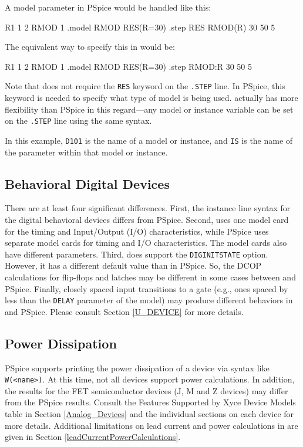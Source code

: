 A model parameter in PSpice would be handled like this:
\begin{vquote}
R1 1 2 RMOD 1
.model RMOD RES(R=30)
.step RES RMOD(R) 30 50 5
\end{vquote}
The equivalent way to specify this in \Xyce{} would be:
\begin{vquote}
R1 1 2 RMOD 1
.model RMOD RES(R=30)
.step RMOD:R 30 50 5
\end{vquote}
Note that \Xyce{} does not require the \texttt{RES} keyword on the
\texttt{.STEP} line.  In PSpice, this keyword is needed to specify 
what type of model is being used.  \Xyce{} actually has more flexibility
than PSpice in this regard---any model or instance variable can be set on
the \texttt{.STEP} line using the same syntax.


In this example, \texttt{D101} is the name of a model or instance, 
and \texttt{IS} is the name of the parameter within that model or instance.

\subsection{Behavioral Digital Devices}
There are at least four significant differences.  First, the instance line
syntax for the \Xyce{} digital behavioral devices differs from PSpice.
Second,  \Xyce{} uses one model card for the timing and Input/Output (I/O)
characteristics, while PSpice uses separate model cards for timing and I/O
characteristics.  The model cards also have different parameters. 
Third, \Xyce{} does support the \texttt{DIGINITSTATE} option. However, it has a
different default value than in PSpice.  So, the DCOP calculations for flip-flops and latches may
be different in some cases between \Xyce{} and PSpice.  Finally, closely spaced input
transitions to a gate (e.g., ones spaced by less than the \texttt{DELAY}
parameter of the \Xyce{} model) may produce different behaviors in \Xyce{}
and PSpice.  Please consult Section \ref{U_DEVICE} for more details.

\subsection{Power Dissipation}
PSpice supports printing the power dissipation of a device via syntax like
\texttt{W(<name>)}.  At this time, not all \Xyce{} devices support power calculations. 
In addition, the \Xyce{} results for the FET semiconductor devices (J, M and Z devices) may 
differ from the PSpice results.  Consult the Features Supported by Xyce Device Models table
in Section \ref{Analog_Devices} and the individual sections on each device for more details.  
Additional limitations on lead current and power
calculations in \Xyce{} are given in Section \ref{leadCurrentPowerCalculations}.

